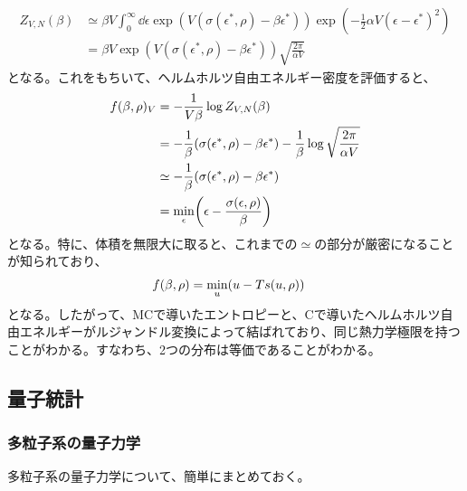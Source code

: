 \documentclass[a4paper,11pt]{jsarticle}
\numberwithin{equation}{section}
\begin{document}
\begin{align}
  Z_{V,N}(\beta) &\simeq \beta V \int_{0}^{\infty}\dd \epsilon \exp(V(\sigma(\epsilon^{*},\rho)-\beta \epsilon^{*})) \exp(-\frac{1}{2}\alpha V(\epsilon-\epsilon^{*})^2)\\
  &= \beta V \exp(V(\sigma(\epsilon^{*},\rho)-\beta \epsilon^{*}))\sqrt{\frac{2\pi}{\alpha V}}
\end{align}
となる。これをもちいて、ヘルムホルツ自由エネルギー密度を評価すると、
\begin{align}
  f(\beta,\rho)_V &= -\frac{1}{V\beta}\log Z_{V,N}(\beta)\\
  &= -\frac{1}{\beta}(\sigma(\epsilon^{*},\rho) -\beta \epsilon^{*} ) -\frac{1}{\beta}\log \sqrt{\frac{2\pi}{\alpha V}}\\
  &\simeq -\frac{1}{\beta}(\sigma(\epsilon^{*},\rho) -\beta \epsilon^{*} ) \\
  &= \underset{\epsilon}{\min} \qty(\epsilon - \frac{\sigma(\epsilon,\rho)}{\beta})
\end{align}
となる。特に、体積を無限大に取ると、これまでの$\simeq$の部分が厳密になることが知られており、
\begin{align}
  f(\beta,\rho) &= \underset{u}{\min} \qty(u - Ts(u,\rho))
\end{align}
となる。したがって、MCで導いたエントロピーと、Cで導いたヘルムホルツ自由エネルギーがルジャンドル変換によって結ばれており、同じ熱力学極限を持つことがわかる。すなわち、2つの分布は等価であることがわかる。\hfill\qedsymbol\\







\subsection{量子統計}
\subsubsection{多粒子系の量子力学}
多粒子系の量子力学について、簡単にまとめておく。\\
\end{document}
